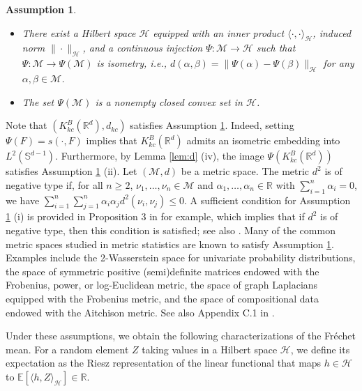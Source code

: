 \documentclass[11pt,reqno]{amsart}
\newtheorem{assumption}{Assumption}
\begin{document}
\begin{assumption}\label{ass:1} \quad 
\begin{itemize}
\item[(i)] There exist a Hilbert space $\mathcal{H}$ equipped with an inner product $\langle \cdot, \cdot \rangle_\mathcal{H}$, induced norm $\|\cdot\|_\mathcal{H}$, and a continuous injection $\Psi:\mathcal{M} \to \mathcal{H}$ such that $\Psi: \mathcal{M} \to \Psi(\mathcal{M})$ is isometry, i.e., $d(\alpha,\beta)=\|\Psi(\alpha)-\Psi(\beta)\|_\mathcal{H}$ for any $\alpha,\beta \in \mathcal{M}$.
\item[(ii)] The set $\Psi(\mathcal{M})$ is a nonempty closed convex set in $\mathcal{H}$.  
\end{itemize}
\end{assumption}
Note that $(K_{kc}^B(\mathbb{R}^d),d_{kc})$ satisfies Assumption \ref{ass:1}. Indeed, setting $\Psi(F) = s(\cdot, F)$ implies that $K_{kc}^B(\mathbb{R}^d)$ admits an isometric embedding into $L^2(\mathbb{S}^{d-1})$. Furthermore, by Lemma \ref{lem:d} (iv), the image $\Psi(K_{kc}^B(\mathbb{R}^d))$ satisfies Assumption \ref{ass:1} (ii). Let $(\mathcal{M},d)$ be a metric space. The metric $d^2$ is of negative type if, for all $n \geq 2$, $\nu_1,\dots,\nu_n \in \mathcal{M}$ and $\alpha_1,\dots, \alpha_n \in \mathbb{R}$ with $\sum_{i=1}^n\alpha_i = 0$, we have $\sum_{i=1}^n\sum_{j=1}^n \alpha_i\alpha_j d^2(\nu_i,\nu_j) \leq 0$. A sufficient condition for Assumption \ref{ass:1} (i) is provided in Proposition 3 in \citet{sejd:13} for example, which implies that if $d^2$ is of negative type, then this condition is satisfied; see also \citet{scho:38}. Many of the common metric spaces studied in metric statistics are known to satisfy Assumption \ref{ass:1}. Examples include the 2-Wasserstein space for univariate probability distributions, the space of symmetric positive (semi)definite matrices endowed with the Frobenius, power, or log-Euclidean metric, the space of graph Laplacians equipped with the Frobenius metric, and the space of compositional data endowed with the Aitchison metric. See also Appendix C.1 in \cite{KuZhOtMu25b}.

Under these assumptions, we obtain the following characterizations of the Fr\'echet mean. For a random element $Z$ taking values in a Hilbert space $\mathcal{H}$, we define its expectation as the Riesz representation of the linear functional that maps $h \in \mathcal{H}$ to $\mathbb{E}[\langle h,Z \rangle_\mathcal{H}] \in \mathbb{R}$.
\end{document}
